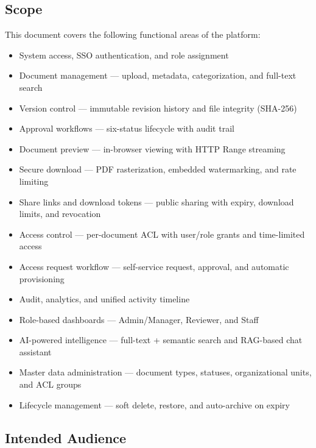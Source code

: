\subsection{Scope}
This document covers the following functional areas of the platform:

\begin{itemize}[leftmargin=18pt]
  \item System access, SSO authentication, and role assignment
  \item Document management --- upload, metadata, categorization,
        and full-text search
  \item Version control --- immutable revision history and file
        integrity (SHA-256)
  \item Approval workflows --- six-status lifecycle with audit trail
  \item Document preview --- in-browser viewing with HTTP Range
        streaming
  \item Secure download --- PDF rasterization, embedded watermarking,
        and rate limiting
  \item Share links and download tokens --- public sharing with
        expiry, download limits, and revocation
  \item Access control --- per-document ACL with user/role grants
        and time-limited access
  \item Access request workflow --- self-service request, approval,
        and automatic provisioning
  \item Audit, analytics, and unified activity timeline
  \item Role-based dashboards --- Admin/Manager, Reviewer, and Staff
  \item AI-powered intelligence --- full-text + semantic search and
        RAG-based chat assistant
  \item Master data administration --- document types, statuses,
        organizational units, and ACL groups
  \item Lifecycle management --- soft delete, restore, and
        auto-archive on expiry
\end{itemize}

\subsection{Intended Audience}

